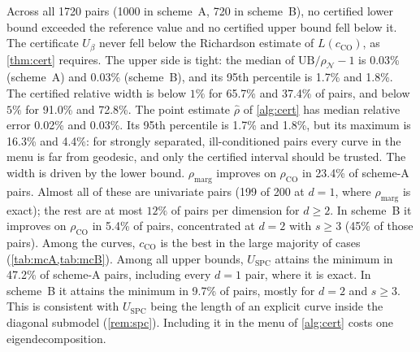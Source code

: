 Across all 1720 pairs (1000 in scheme~A, 720 in scheme~B), no certified lower bound exceeded the reference value and no certified upper bound fell below it. The certificate $U_\beta$ never fell below the Richardson estimate of $L(c_{\mathrm{CO}})$, as \cref{thm:cert} requires. The upper side is tight: the median of $\mathrm{UB}/\rho_\mathcal{N}-1$ is 0.03\% (scheme~A) and 0.03\% (scheme~B), and its 95th percentile is 1.7\% and 1.8\%. The certified relative width is below $1\%$ for 65.7\% and 37.4\% of pairs, and below $5\%$ for 91.0\% and 72.8\%. The point estimate $\hat\rho$ of \cref{alg:cert} has median relative error 0.02\% and 0.03\%. Its 95th percentile is 1.7\% and 1.8\%, but its maximum is 16.3\% and 4.4\%: for strongly separated, ill-conditioned pairs every curve in the menu is far from geodesic, and only the certified interval should be trusted. The width is driven by the lower bound. $\rho_{\mathrm{marg}}$ improves on $\rho_{\mathrm{CO}}$ in 23.4\% of scheme-A pairs. Almost all of these are univariate pairs (199 of 200 at $d=1$, where $\rho_{\mathrm{marg}}$ is exact); the rest are at most $12\%$ of pairs per dimension for $d\ge2$. In scheme~B it improves on $\rho_{\mathrm{CO}}$ in 5.4\% of pairs, concentrated at $d=2$ with $s\ge3$ (45\% of those pairs). Among the curves, $c_{\mathrm{CO}}$ is the best in the large majority of cases (\cref{tab:mcA,tab:mcB}). Among all upper bounds, $U_{\mathrm{SPC}}$ attains the minimum in 47.2\% of scheme-A pairs, including every $d=1$ pair, where it is exact. In scheme~B it attains the minimum in 9.7\% of pairs, mostly for $d=2$ and $s\ge3$. This is consistent with $U_{\mathrm{SPC}}$ being the length of an explicit curve inside the diagonal submodel (\cref{rem:spc}). Including it in the menu of \cref{alg:cert} costs one eigendecomposition.